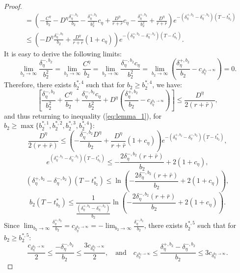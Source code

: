 \documentclass[11pt]{article}
\begin{document}
\begin{proof}
\begin{equation}
\begin{split}
	&= \left(-\frac{C^\eta}{b_2}-D^\eta\frac{\delta^{-,b_2}_\eta}{b_2} -\frac{\delta^{+,b_2}_\eta}{b_2^2}c_\eta +\frac{D^\eta}{r+\bar{r}}c_\eta -\frac{\delta^{+,b_2}_\eta}{b_2^2} +\frac{D^\eta}{r+\bar{r}} \right) e^{-\left(\delta^{+,b_2}_\eta -\delta^{-,b_2}_\eta\right)(T-t^*_{b_2})} \\
	&\leq  \left(-D^\eta\frac{\delta^{-,b_2}_\eta }{b_2}+\frac{D^\eta}{r+\bar{r}}(1+c_\eta) \right) e^{-\left(\delta^{+,b_2}_\eta -\delta^{-,b_2}_\eta\right)(T-t^*_{b_2})}.
	\end{split}
	\label{eq:lemma_1}
	\end{equation}
	It is easy to derive the following limits:
	$$\lim_{b_2 \to \infty}\frac{\delta^{-,b_2}_\eta}{b_2^2}=\lim_{b_2 \to \infty}\frac{C^\eta}{b_2}=\lim_{b_2 \to \infty}\frac{\delta^{-,b_2}_\eta c_\eta}{b_2^2}=\lim_{b_2 \to \infty}\left(\frac{\delta^{+,b_2}_\eta}{b_2}-c_{\delta^{b_2 \to \infty}_\eta} \right) =0.$$
	Therefore, there exists $b_2^{*,4}$ such that for $b_2 \geq b_2^{*,4}$, we have:
	$$\left[\frac{\delta^{-,b_2}_\eta}{b_2^2}+\frac{C^\eta}{b_2}+\frac{\delta^{-,b_2}_\eta c_\eta}{b_2^2}+D^\eta \left(\frac{\delta^{+,b_2}_\eta}{b_2}-c_{\delta^{b_2 \to \infty}_\eta} \right)\right] \leq \frac{D^\eta}{2(r+\bar{r})},$$
	and thus returning to inequality (\ref{eq:lemma_1}), for $b_2 \geq \max \{b_2^{*,1},b_2^{*,2},b_2^{*,3},b_2^{*,4} \}$:
	$$\frac{D^\eta}{2(r+\bar{r})}\leq \left(-\frac{\delta^{-,b_2}_\eta D^\eta}{b_2}+\frac{D^\eta}{r+\bar{r}}(1+c_\eta) \right) e^{-\left(\delta^{+,b_2}_\eta -\delta^{-,b_2}_\eta\right)(T-t^*_{b_2})}, $$
	$$e^{\left(\delta^{+,b_2}_\eta -\delta^{-,b_2}_\eta\right)(T-t^*_{b_2})}\leq -\frac{2\delta^{-,b_2}_\eta(r+\bar{r})}{b_2}+2(1+c_\eta) , $$
	$$\left(\delta^{+,b_2}_\eta -\delta^{-,b_2}_\eta\right)(T-t^*_{b_2})\leq \ln \left( -\frac{2\delta^{-,b_2}_\eta(r+\bar{r})}{b_2}+2(1+c_\eta) \right) , $$
	\begin{equation}
	b_2(T-t^*_{b_2})\leq \frac{1}{\frac{\left(\delta^{+,b_2}_\eta -\delta^{-,b_2}_\eta\right)}{b_2}} \ln \left( -\frac{2\delta^{-,b_2}_\eta(r+\bar{r})}{b_2}+2(1+c_\eta) \right).
	\label{eq:lemma_2}
	\end{equation}
	Since $\lim_{b_2 \to \infty}\frac{\delta^{+,b_2}_\eta}{b_2}=c_{\delta_\eta^{b_2 \to \infty}}=-\lim_{b_2 \to \infty}\frac{\delta^{-,b_2}_\eta}{b_2}$, there exists $b_2^{*,5}$ such that for $b_2 \geq b_2^{*,5}$:
	$$\frac{c_{\delta_\eta^{b_2 \to \infty}}}{2} \leq \frac{-\delta^{-,b_2}_\eta}{b_2} \leq \frac{3c_{\delta_\eta^{b_2 \to \infty}}}{2}, \quad \text{and} \quad c_{\delta_\eta^{b_2 \to \infty}} \leq \frac{\delta^{+,b_2}_\eta-\delta^{-,b_2}_\eta}{b_2} \leq 3c_{\delta_\eta^{b_2 \to \infty}}.$$	

\end{proof}
\end{document}

